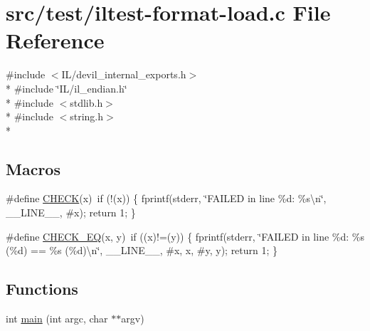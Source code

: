 \hypertarget{iltest-format-load_8c}{\section{src/test/iltest-\/format-\/load.c File Reference}
\label{iltest-format-load_8c}
}
{\ttfamily \#include $<$I\-L/devil\-\_\-internal\-\_\-exports.\-h$>$}\\*
{\ttfamily \#include \char`\"{}I\-L/il\-\_\-endian.\-h\char`\"{}}\\*
{\ttfamily \#include $<$stdlib.\-h$>$}\\*
{\ttfamily \#include $<$string.\-h$>$}\\*
\subsection*{Macros}
\begin{DoxyCompactItemize}
\item 
\#define \hyperlink{iltest-format-load_8c_a763ffd798508592c5092ac77daa5a659}{C\-H\-E\-C\-K}(x)~if (!(x)) \{ fprintf(stderr, \char`\"{}F\-A\-I\-L\-E\-D in line \%d\-: \%s\textbackslash{}n\char`\"{}, \-\_\-\-\_\-\-L\-I\-N\-E\-\_\-\-\_\-, \#x); return 1; \}
\item 
\#define \hyperlink{iltest-format-load_8c_a6b889b604912562c774bb68b2960e8d3}{C\-H\-E\-C\-K\-\_\-\-E\-Q}(x, y)~if ((x)!=(y)) \{ fprintf(stderr, \char`\"{}F\-A\-I\-L\-E\-D in line \%d\-: \%s (\%d) == \%s (\%d)\textbackslash{}n\char`\"{}, \-\_\-\-\_\-\-L\-I\-N\-E\-\_\-\-\_\-, \#x, x, \#y, y); return 1; \}
\end{DoxyCompactItemize}
\subsection*{Functions}
\begin{DoxyCompactItemize}
\item 
int \hyperlink{iltest-format-load_8c_a3c04138a5bfe5d72780bb7e82a18e627}{main} (int argc, char $\ast$$\ast$argv)
\end{DoxyCompactItemize}


